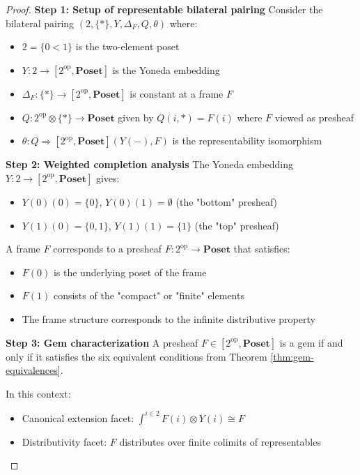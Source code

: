 \documentclass[11pt]{article}
\theoremstyle{plain}
\theoremstyle{definition}
\theoremstyle{remark}
\newcommand{\op}{\mathrm{op}}
\begin{document}
\begin{proof}
\textbf{Step 1: Setup of representable bilateral pairing}
Consider the bilateral pairing $(2, \{\ast\}, Y, \Delta_F, Q, \theta)$ where:
\begin{itemize}
\item $2 = \{0 < 1\}$ is the two-element poset
\item $Y : 2 \to [2^{\op}, \mathbf{Poset}]$ is the Yoneda embedding
\item $\Delta_F : \{\ast\} \to [2^{\op}, \mathbf{Poset}]$ is constant at a frame $F$
\item $Q : 2^{\op} \otimes \{\ast\} \to \mathbf{Poset}$ given by $Q(i, \ast) = F(i)$ where $F$ viewed as presheaf
\item $\theta : Q \Rightarrow [2^{\op}, \mathbf{Poset}](Y(-), F)$ is the representability isomorphism
\end{itemize}

\textbf{Step 2: Weighted completion analysis}
The Yoneda embedding $Y : 2 \to [2^{\op}, \mathbf{Poset}]$ gives:
\begin{itemize}
\item $Y(0)(0) = \{0\}$, $Y(0)(1) = \emptyset$ (the "bottom" presheaf)
\item $Y(1)(0) = \{0, 1\}$, $Y(1)(1) = \{1\}$ (the "top" presheaf)
\end{itemize}

A frame $F$ corresponds to a presheaf $F : 2^{\op} \to \mathbf{Poset}$ that satisfies:
\begin{itemize}
\item $F(0)$ is the underlying poset of the frame
\item $F(1)$ consists of the "compact" or "finite" elements
\item The frame structure corresponds to the infinite distributive property
\end{itemize}

\textbf{Step 3: Gem characterization}
A presheaf $F \in [2^{\op}, \mathbf{Poset}]$ is a gem if and only if it satisfies the six equivalent conditions from Theorem \ref{thm:gem-equivalences}.

In this context:
\begin{itemize}
\item Canonical extension facet: $\int^{i \in 2} F(i) \otimes Y(i) \cong F$
\item Distributivity facet: $F$ distributes over finite colimits of representables
\end{itemize}


\end{proof}
\end{document}
